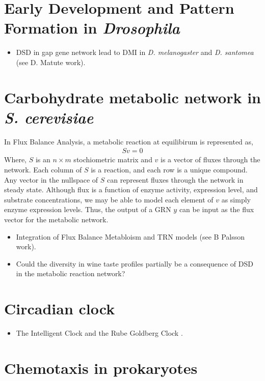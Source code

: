 \documentclass[11 pt]{article}
\begin{document}
    \section{Early Development and Pattern Formation in \emph{Drosophila}}
    \begin{itemize}
      \item DSD in gap gene network lead to DMI in \emph{D. melanogaster} and \emph{D. santomea} (see D. Matute work). 
    \end{itemize}
    \section{Carbohydrate metabolic network in \emph{S. cerevisiae}}

    In Flux Balance Analysis, a metabolic reaction at equilibirum is represented as, 
    \begin{align*}
      Sv = 0
    \end{align*}
    Where, $S$ is an $n \times m$ stochiometric matrix and $v$ is a vector of fluxes through the network. Each column of $S$ is a reaction, and each row is a unique compound. Any vector in the nullspace of $S$ can represent fluxes through the network in steady state. Although flux is a function of enzyme activity, expression level, and substrate concentrations, we may be able to model each element of $v$ as simply enzyme expression levels. Thus, the output of a GRN $y$ can be input as the flux vector for the metabolic network. 
      \begin{itemize}
        \item Integration of Flux Balance Metabloism and TRN models (see B Palsson work).
        \item Could the diversity in wine taste profiles partially be a consequence of DSD in the metabolic reaction network? 
      \end{itemize}
    \section{Circadian clock}
      \begin{itemize}
        \item The Intelligent Clock and the Rube Goldberg Clock \citep{sancar2008intelligent}.
      \end{itemize}
    \section{Chemotaxis in prokaryotes}



\end{document}
